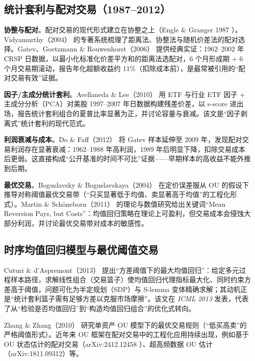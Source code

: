 \documentclass[11pt,a4paper]{ctexart}
\begin{document}
\subsection{统计套利与配对交易（1987--2012）}\label{sec:statarb}

\textbf{协整与配对}。配对交易的现代形式建立在协整之上（Engle \& Granger 1987 \cite{englegranger1987}）。Vidyamurthy（2004）\cite{vidyamurthy2004} 的专著系统梳理了距离法、协整法与随机价差法的配对选择。Gatev、Goetzmann \& Rouwenhorst（2006）\cite{gatev2006} 提供经典实证：1962--2002 年 CRSP 日数据，以最小化标准化价差平方和的距离法选配对，6 个月形成期 + 6 个月交易期滚动，报告年化超额收益约 11\%（扣除成本前），是最常被引用的“配对交易有效”证据。

\textbf{因子/主成分统计套利}。Avellaneda \& Lee（2010）\cite{avellaneda2010} 用 ETF 与行业 ETF 因子 + 主成分分析（PCA）对美股 1997--2007 年日数据构建残差价差，以 s-score 进出场，报告统计套利组合的夏普比率显著为正，并讨论容量与衰减。该文是“因子剥离式”统计套利的现代范式。

\textbf{利润衰减与成本}。Do \& Faff（2012）\cite{dofaff2012} 将 Gatev 样本延伸至 2009 年，发现配对交易利润存在显著衰减：1962--1988 年高利润，1989 年后明显下降，扣除交易成本后更弱。这直接构成“公开基准的时间不可比”证据——早期样本的高收益不能外推到后期。

\textbf{最优交易}。Boguslavsky \& Boguslavskaya（2004）\cite{boguslavsky2004} 在定价误差服从 OU 的假设下推导对称阈值最优交易带（“只买显著低于均值、卖显著高于均值”的工程化形式）。Martin \& Sch\"oneborn（2011）\cite{martin2011} 的理论与数值研究给出关键词“Mean Reversion Pays, but Costs”：均值回归策略在理论上可盈利，但交易成本会侵蚀大部分利润，并讨论最优交易带对成本的敏感性。

\subsection{时序均值回归模型与最优阈值交易}\label{sec:timemodel}

Cuturi \& d'Aspremont（2013）\cite{cuturi2013} 提出“方差阈值下的最大均值回归”：给定多元过程样本路径，求解线性组合（交易篮子）使均值回归代理指标最大化、同时约束方差高于阈值，问题可化为半定规划（SDP）与 S-lemma 变体精确求解；其动机正是“统计套利篮子需有足够方差以克服市场摩擦”。该文在 \emph{ICML 2013} 发表，代表了从“检验是否均值回归”到“构造均值回归组合”的优化式转向。

Zhang \& Zhang（2010）\cite{zhangzhang2010} 研究单资产 OU 模型下的最优交易规则（“低买高卖”的严格阈值形式）。近年来 OU 框架在配对交易中的工程化应用持续出现，例如基于 OU 状态估计的配对交易（arXiv:2412.12458 \cite{arxiv_ou_pairs}）、超高频数据 OU 估计（arXiv:1811.09312）等。
\end{document}
